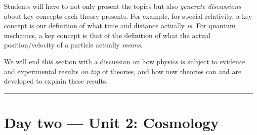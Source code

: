\documentclass{tufte-handout}
\begin{document}
\begin{fullwidth}
Students will have to not only present the topics but also \textit{generate discussions} about key concepts each theory presents. For example, 
for special relativity, a key concept is our definition of what time and distance actually \textit{is}. For quantum mechanics, a key 
concept is that of the definition of what the actual position/velocity of a particle actually \textit{means}.

We will end this section with a discussion on how physics is subject to evidence and experimental results \textit{on top} of theories, and 
how new theories can and are developed to explain these results.

\end{fullwidth}
\pagebreak

\noindent\textcolor{Red}{\rule{16cm}{3mm}}
\section{Day two --- Unit 2: Cosmology}
\end{document}
